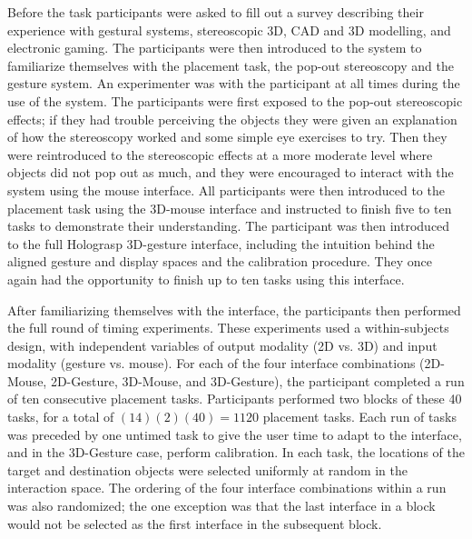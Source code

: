 \documentclass[pageno]{jpaper}
\begin{document}
Before the task participants were asked to fill out a survey describing their experience with
gestural systems, stereoscopic 3D, CAD and 3D modelling, and electronic gaming.
The participants were then introduced to the system to familiarize themselves with the placement task, the pop-out
stereoscopy and the gesture system. An experimenter was with the participant at all times during
the use of the system. The participants were first exposed to the pop-out stereoscopic effects;
if they had trouble perceiving the objects they were given an explanation of how the stereoscopy
worked and some simple eye exercises to try. Then they were reintroduced to the stereoscopic effects
at a more moderate level where objects did not pop out as much, and they were encouraged
to interact with the system using the mouse interface. All participants were then introduced to the placement
task using the 3D-mouse interface and instructed to finish five to ten tasks to demonstrate their understanding.
The participant was then introduced to the full Holograsp 3D-gesture interface, including the intuition behind the aligned gesture and display
spaces and the calibration procedure. They once again had the opportunity to finish up to ten tasks using this interface.

After familiarizing themselves with the interface, the participants then performed the full round of timing experiments. These
experiments used a within-subjects design, with independent variables of output modality (2D vs. 3D) and input modality (gesture vs. mouse).
For each of the four interface combinations (2D-Mouse, 2D-Gesture, 3D-Mouse, and 3D-Gesture), the participant completed a
run of ten consecutive placement tasks. Participants performed two blocks of these 40 tasks, for a total of $(14)(2)(40) = 1120$
placement tasks. Each run of tasks was preceded by one untimed task to give the user time to adapt to the interface, and
in the 3D-Gesture case, perform calibration. In each task, the locations of the target and destination objects were selected uniformly at random in the interaction space. The
ordering of the four interface combinations within a run was also randomized; the one exception was that the last interface in a block
would not be selected as the first interface in the subsequent block.
\end{document}

